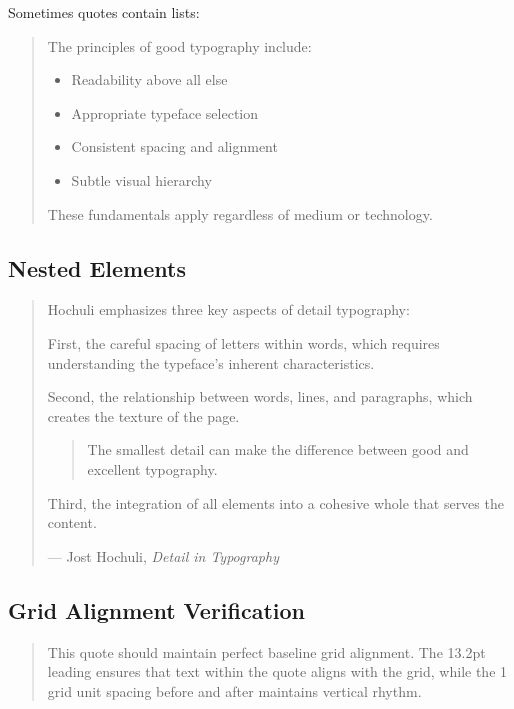 \documentclass[11pt,a4paper]{article}
\begin{document}
Sometimes quotes contain lists:
\begin{quote}
The principles of good typography include:
\begin{itemize}
\item Readability above all else
\item Appropriate typeface selection
\item Consistent spacing and alignment
\item Subtle visual hierarchy
\end{itemize}
These fundamentals apply regardless of medium or technology.
\end{quote}

\subsection{Nested Elements}

\begin{quotation}
Hochuli emphasizes three key aspects of detail typography:

First, the careful spacing of letters within words, which requires understanding the typeface's inherent characteristics.

Second, the relationship between words, lines, and paragraphs, which creates the texture of the page.

\begin{quote}
The smallest detail can make the difference between good and excellent typography.
\end{quote}

Third, the integration of all elements into a cohesive whole that serves the content.

\hfill--- Jost Hochuli, \textit{Detail in Typography}
\end{quotation}

\subsection{Grid Alignment Verification}

\lipsum[1][1-3]

\begin{quote}
This quote should maintain perfect baseline grid alignment. The 13.2pt leading ensures that text within the quote aligns with the grid, while the 1 grid unit spacing before and after maintains vertical rhythm.
\end{quote}

\lipsum[2][1-3]
\end{document}
